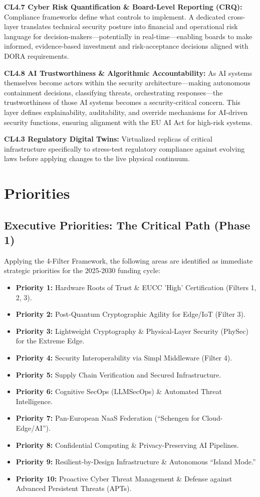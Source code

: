 \documentclass[12pt,a4paper]{article}
\begin{document}
\textbf{CL4.7 Cyber Risk Quantification \& Board-Level Reporting (CRQ):} Compliance frameworks define what controls to implement. A dedicated cross-layer translates technical security posture into financial and operational risk language for decision-makers---potentially in real-time---enabling boards to make informed, evidence-based investment and risk-acceptance decisions aligned with DORA requirements.

\textbf{CL4.8 AI Trustworthiness \& Algorithmic Accountability:} As AI systems themselves become actors within the security architecture---making autonomous containment decisions, classifying threats, orchestrating responses---the trustworthiness of those AI systems becomes a security-critical concern. This layer defines explainability, auditability, and override mechanisms for AI-driven security functions, ensuring alignment with the EU AI Act for high-risk systems.



\textbf{CL4.3 Regulatory Digital Twins:} Virtualized replicas of critical infrastructure specifically to stress-test regulatory compliance against evolving laws before applying changes to the live physical continuum.

\section{Priorities}
\subsection{Executive Priorities: The Critical Path (Phase 1)}
Applying the 4-Filter Framework, the following areas are identified as immediate strategic priorities for the 2025-2030 funding cycle:
\begin{itemize}
    \item \textbf{Priority 1:} Hardware Roots of Trust \& EUCC 'High' Certification (Filters 1, 2, 3).
    \item \textbf{Priority 2:} Post-Quantum Cryptographic Agility for Edge/IoT (Filter 3).
    \item \textbf{Priority 3:} Lightweight Cryptography \& Physical-Layer Security (PhySec) for the Extreme Edge.
    \item \textbf{Priority 4:} Security Interoperability via Simpl Middleware (Filter 4).
    \item \textbf{Priority 5:} Supply Chain Verification and Secured Infrastructure.
    \item \textbf{Priority 6:} Cognitive SecOps (LLMSecOps) \& Automated Threat Intelligence.
    \item \textbf{Priority 7:} Pan-European NaaS Federation (``Schengen for Cloud-Edge/AI'').
    \item \textbf{Priority 8:} Confidential Computing \& Privacy-Preserving AI Pipelines.
    \item \textbf{Priority 9:} Resilient-by-Design Infrastructure \& Autonomous ``Island Mode.''
    \item \textbf{Priority 10:} Proactive Cyber Threat Management \& Defense against Advanced Persistent Threats (APTs).
\end{itemize}
\end{document}
